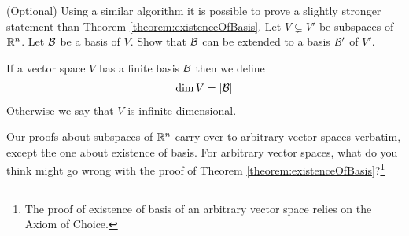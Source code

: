 \begin{qbox}(Optional)
  Using a similar algorithm it is possible to prove a slightly stronger statement than Theorem \ref{theorem:existenceOfBasis}.
  Let $V \subsetneq V'$ be subspaces of $\mathbb{R}^n$. Let $\mathcal{B}$ be a basis of $V$. Show that $\mathcal{B}$ can be extended to a basis $\mathcal{B}'$ of $V'$.
\end{qbox}












\begin{definition}
  If a vector space $V$ has a finite basis $\mathcal{B}$ then we define
  \begin{align*}
    \dim V = \left\lvert \mathcal{B} \right\rvert
  \end{align*}
  Otherwise we say that $V$ is infinite dimensional.
\end{definition}

\begin{remark}
  Our proofs about subspaces of $\mathbb{R}^n$ carry over to arbitrary vector spaces verbatim, except the one about existence of basis. For arbitrary vector spaces, what do you think might go wrong with the proof of Theorem \ref{theorem:existenceOfBasis}?\footnote{The proof of existence of basis of an arbitrary vector space relies on the Axiom of Choice.}
\end{remark}











